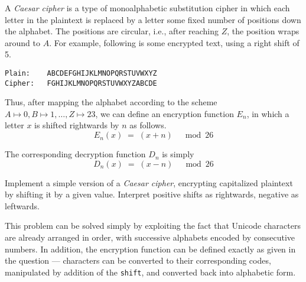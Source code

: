 

\problem A {\em Caesar cipher} is a type of monoalphabetic substitution cipher in which each letter
in the plaintext is replaced by a letter some fixed number of positions down the alphabet. The positions
are circular, i.e., after reaching $Z$, the position wraps around to $A$. For example, following is some encrypted
text, using a right shift of 5.

\begin{lstlisting}[numbers=none, xleftmargin=.25\textwidth, xrightmargin=.2\textwidth]
Plain:    ABCDEFGHIJKLMNOPQRSTUVWXYZ
Cipher:   FGHIJKLMNOPQRSTUVWXYZABCDE
\end{lstlisting}

Thus, after mapping the alphabet according to the scheme $A\mapsto 0, B\mapsto 1,\dots,Z\mapsto 23$, we can define
an encryption function $E_n$, in which a letter $x$ is shifted rightwards by $n$ as follows.
\begin{equation*}
	E_n(x)	\;=\;	(x + n)	\quad\bmod 26
\end{equation*}

The corresponding decryption function $D_n$ is simply
\begin{equation*}
	D_n(x)	\;=\;	(x - n)	\quad\bmod 26
\end{equation*}

Implement a simple version of a {\em Caesar cipher}, encrypting capitalized plaintext by shifting it by a given value.
Interpret positive shifts as rightwards, negative as leftwards.

\solution This problem can be solved simply by exploiting the fact that Unicode characters are already arranged in order, with successive alphabets encoded by consecutive numbers. In addition, the encryption function can be defined exactly as given in the question --- characters can be converted to their corresponding codes, manipulated by addition of the {\tt shift}, and converted back into alphabetic form.

